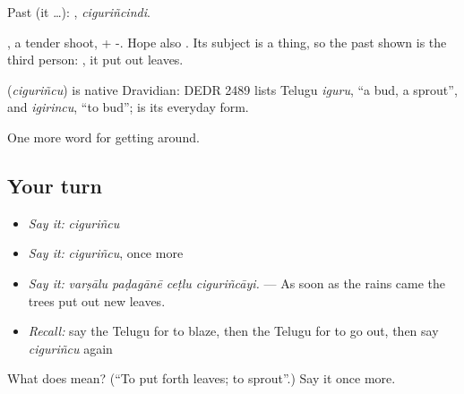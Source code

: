 Past (it …): , \emph{ciguriñcindi}.

, a tender shoot, + -. Hope also . Its subject is a thing, so the past shown is the third person: , it put out leaves.

\begin{cousinweb}
\textbf{} (\emph{ciguriñcu}) is native Dravidian: DEDR 2489 lists Telugu \emph{iguru}, \textquotedblleft{}a bud, a sprout\textquotedblright{}, and \emph{igirincu}, \textquotedblleft{}to bud\textquotedblright{};  is its everyday form.
\end{cousinweb}

\begin{grammarlens}[title={What you've built}]
One more word for getting around.
\end{grammarlens}

\subsection*{Your turn}
\begin{itemize}
\raggedright
  \item \emph{Say it:} \emph{ciguriñcu}
  \item \emph{Say it:} \emph{ciguriñcu}, once more
  \item \emph{Say it:} \emph{varṣālu paḍagānē ceṭlu ciguriñcāyi.} — As soon as the rains came the trees put out new leaves.
  \item \emph{Recall:} say the Telugu for to blaze, then the Telugu for to go out, then say \emph{ciguriñcu} again
\end{itemize}

\begin{tcolorbox}[breakable,colback=teal!4,colframe=teal!35!black,title={Before you move on}]
What does  mean? (\textquotedblleft{}To put forth leaves; to sprout\textquotedblright{}.) Say it once more.
\end{tcolorbox}
